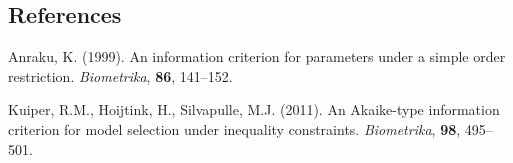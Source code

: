 \documentclass[12pt]{article}
\begin{document}
%        
%
%        

\subsection*{References}

\begin{description}

\item
Anraku, K. (1999).
An information criterion for parameters under a simple order restriction.
\textit{Biometrika}, \textbf{86}, 141--152.

\item
Kuiper, R.M., Hoijtink, H., Silvapulle, M.J. (2011).
An Akaike-type information criterion for model selection under inequality constraints. 
\textit{Biometrika}, \textbf{98}, 495--501.

\end{description}
\end{document}
